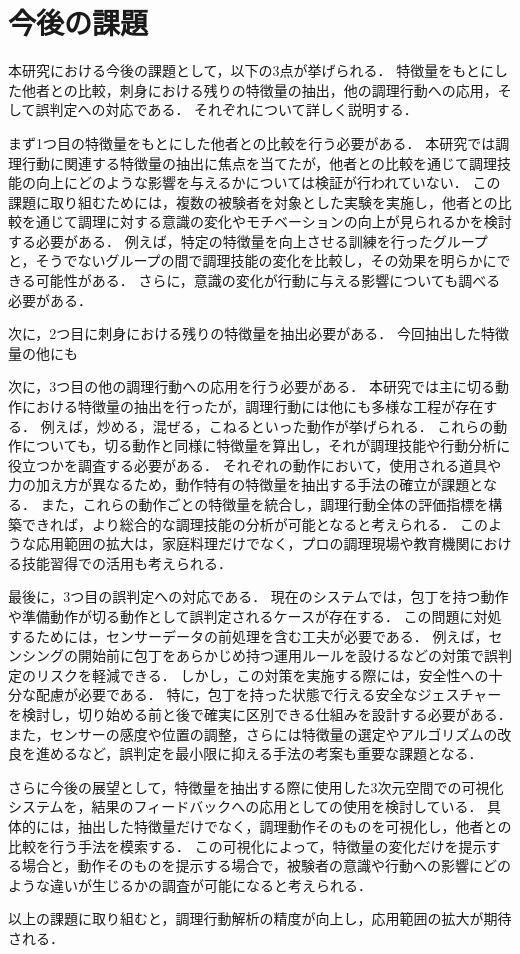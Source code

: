 \section{今後の課題}
本研究における今後の課題として，以下の3点が挙げられる．
特徴量をもとにした他者との比較，刺身における残りの特徴量の抽出，他の調理行動への応用，そして誤判定への対応である．
それぞれについて詳しく説明する．

まず1つ目の特徴量をもとにした他者との比較を行う必要がある．
本研究では調理行動に関連する特徴量の抽出に焦点を当てたが，他者との比較を通じて調理技能の向上にどのような影響を与えるかについては検証が行われていない．
この課題に取り組むためには，複数の被験者を対象とした実験を実施し，他者との比較を通じて調理に対する意識の変化やモチベーションの向上が見られるかを検討する必要がある．
例えば，特定の特徴量を向上させる訓練を行ったグループと，そうでないグループの間で調理技能の変化を比較し，その効果を明らかにできる可能性がある．
さらに，意識の変化が行動に与える影響についても調べる必要がある．

次に，2つ目に刺身における残りの特徴量を抽出必要がある．
今回抽出した特徴量の他にも


次に，3つ目の他の調理行動への応用を行う必要がある．
本研究では主に切る動作における特徴量の抽出を行ったが，調理行動には他にも多様な工程が存在する．
例えば，炒める，混ぜる，こねるといった動作が挙げられる．
これらの動作についても，切る動作と同様に特徴量を算出し，それが調理技能や行動分析に役立つかを調査する必要がある．
それぞれの動作において，使用される道具や力の加え方が異なるため，動作特有の特徴量を抽出する手法の確立が課題となる．
また，これらの動作ごとの特徴量を統合し，調理行動全体の評価指標を構築できれば，より総合的な調理技能の分析が可能となると考えられる．
このような応用範囲の拡大は，家庭料理だけでなく，プロの調理現場や教育機関における技能習得での活用も考えられる．

最後に，3つ目の誤判定への対応である．
現在のシステムでは，包丁を持つ動作や準備動作が切る動作として誤判定されるケースが存在する．
この問題に対処するためには，センサーデータの前処理を含む工夫が必要である．
例えば，センシングの開始前に包丁をあらかじめ持つ運用ルールを設けるなどの対策で誤判定のリスクを軽減できる．
しかし，この対策を実施する際には，安全性への十分な配慮が必要である．
特に，包丁を持った状態で行える安全なジェスチャーを検討し，切り始める前と後で確実に区別できる仕組みを設計する必要がある．
また，センサーの感度や位置の調整，さらには特徴量の選定やアルゴリズムの改良を進めるなど，誤判定を最小限に抑える手法の考案も重要な課題となる．

さらに今後の展望として，特徴量を抽出する際に使用した3次元空間での可視化システムを，結果のフィードバックへの応用としての使用を検討している．
具体的には，抽出した特徴量だけでなく，調理動作そのものを可視化し，他者との比較を行う手法を模索する．
この可視化によって，特徴量の変化だけを提示する場合と，動作そのものを提示する場合で，被験者の意識や行動への影響にどのような違いが生じるかの調査が可能になると考えられる．

以上の課題に取り組むと，調理行動解析の精度が向上し，応用範囲の拡大が期待される．